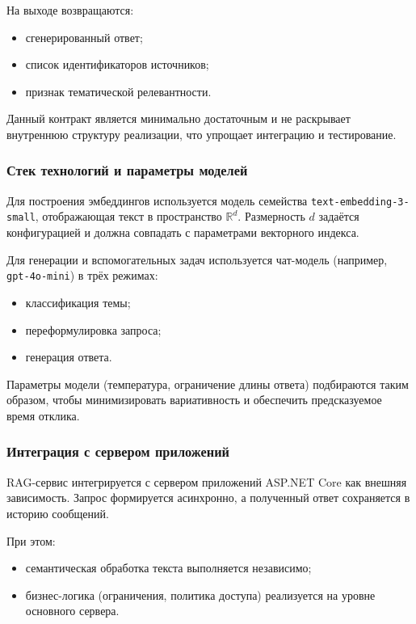 \documentclass{article}
\begin{document}
На выходе возвращаются:
\begin{itemize}
\item сгенерированный ответ;
\item список идентификаторов источников;
\item признак тематической релевантности.
\end{itemize}

Данный контракт является минимально достаточным и не раскрывает внутреннюю структуру реализации, что упрощает интеграцию и тестирование.

\subsubsection{Стек технологий и параметры моделей}

Для построения эмбеддингов используется модель семейства \texttt{text-embedding-3-small}, отображающая текст в пространство $\mathbb{R}^d$. Размерность $d$ задаётся конфигурацией и должна совпадать с параметрами векторного индекса.

Для генерации и вспомогательных задач используется чат-модель (например, \texttt{gpt-4o-mini}) в трёх режимах:
\begin{itemize}
\item классификация темы;
\item переформулировка запроса;
\item генерация ответа.
\end{itemize}

Параметры модели (температура, ограничение длины ответа) подбираются таким образом, чтобы минимизировать вариативность и обеспечить предсказуемое время отклика.

\subsubsection{Интеграция с сервером приложений}

RAG-сервис интегрируется с сервером приложений ASP.NET Core как внешняя зависимость. Запрос формируется асинхронно, а полученный ответ сохраняется в историю сообщений.

При этом:
\begin{itemize}
\item семантическая обработка текста выполняется независимо;
\item бизнес-логика (ограничения, политика доступа) реализуется на уровне основного сервера.
\end{itemize}
\end{document}
